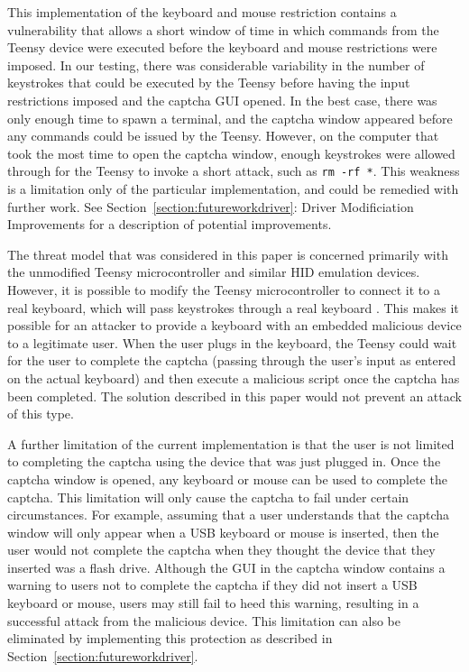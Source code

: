 \documentclass[pagenumbers]{ieee}
\begin{document}
This implementation of the keyboard and mouse restriction contains a vulnerability that allows a short window of time in which commands from the Teensy device were executed before the keyboard and mouse restrictions were imposed. In our testing, there was considerable variability in the number of keystrokes that could be executed by the Teensy before having the input restrictions imposed and the captcha GUI opened. In the best case, there was only enough time to spawn a terminal, and the captcha window appeared before any commands could be issued by the Teensy. However, on the computer that took the most time to open the captcha window, enough keystrokes were allowed through for the Teensy to invoke a short attack, such as \texttt{rm -rf *}.  This weakness is a limitation only of the particular implementation, and could be remedied with further work. See Section~\ref{section:futureworkdriver}: Driver Modificiation Improvements for a description of potential improvements.

The threat model that was considered in this paper is concerned primarily with the unmodified Teensy microcontroller and similar HID emulation devices. However, it is possible to modify the Teensy microcontroller to connect it to a real keyboard, which will pass keystrokes through a real keyboard \cite{pjrc}. This makes it possible for an attacker to provide a keyboard with an embedded malicious device to a legitimate user. When the user plugs in the keyboard, the Teensy could wait for the user to complete the captcha (passing through the user's input as entered on the actual keyboard) and then execute a malicious script once the captcha has been completed. The solution described in this paper would not prevent an attack of this type.

A further limitation of the current implementation is that the user is not limited to completing the captcha using the device that was just plugged in.  Once the captcha window is opened, any keyboard or mouse can be used to complete the captcha. This limitation will only cause the captcha to fail under certain circumstances. For example, assuming that a user understands that the captcha window will only appear when a USB keyboard or mouse is inserted, then the user would not complete the captcha when they thought the device that they inserted was a flash drive. Although the GUI in the captcha window contains a warning to users not to complete the captcha if they did not insert a USB keyboard or mouse, users may still fail to heed this warning, resulting in a successful attack from the malicious device. This limitation can also be eliminated by implementing this protection as described in Section~\ref{section:futureworkdriver}.
\end{document}
